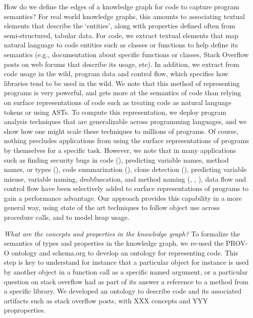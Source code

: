 How do we define the edges of a knowledge graph for code to capture program semantics?  For real world knowledge graphs, this amounts to associating textual elements that describe the `entities', along with properties defined often from semi-structured, tabular data.  For code, we extract textual elements that map natural language to code entities such as classes or functions to help define its semantics (e.g., documentation about specific functions or classes, Stack Overflow posts on web forums that describe its usage, etc).  In addition, we extract from code usage in the wild, program data and control flow, which specifies how libraries tend to be used in the wild.  We note that this method of representing programs is very powerful, and gets more at the semantics of code than relying on surface representations of code such as treating code as natural language tokens or using ASTs.  To compute this representation, we deploy program analysis techniques that are generalizable across programming languages, and we show how one might scale these techniques to millions of programs.  Of course, nothing precludes applications from using the surface representations of programs by themselves for a specific task.  However, we note that in many applications such as finding security bugs in code (\cite{DBLP:journals/corr/abs-1807-06756}), predicting variable names, method names, or types (\cite{DBLP:journals/corr/abs-1803-09544}), code summarization (\cite{DBLP:journals/corr/abs-1708-01837}), clone detection (\cite{White:2016:DLC:2970276.2970326}), predicting variable misuse, variable naming, deobfuscation, and method naming (\cite{DBLP:journals/corr/abs-1711-00740}, \cite{Bichsel:2016:SDA:2976749.2978422}, \cite{DBLP:journals/corr/abs-1808-01400}), data flow and control flow have been selectively added to surface representations of programs to gain a performance advantage.  Our approach provides this capability in a more general way, using state of the art techniques to follow object use across procedure calls, and to model heap usage. 

\textit{What are the concepts and properties in the knowledge graph?}
To formalize the semantics of types and properties in the knowledge graph, we re-used the PROV-O ontology \cite{733f89c65e4844f9aabcae1c276a5602} and schema.org \cite{Guha:2015:SES:2857274.2857276} to develop an ontology for representing code.  This step is key to understand for instance that a particular object for instance is used by another object in a function call as a specific named argument, or a particular question on stack overflow had as part of its answer a reference to a method from a specific library.  We developed an ontology to describe code and its associated artifacts such as stack overflow posts, with XXX concepts and YYY proproperties.

